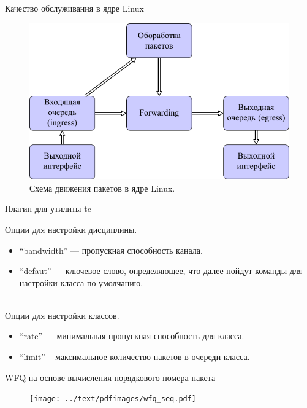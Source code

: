 \documentclass[12pt]{beamer}
\begin{document}
\begin{frame}{Качество обслуживания в ядре Linux}
	\begin{figure}
		\center
    	\includegraphics[scale=0.8]{../text/pdfimages/qdisc.pdf}
		\caption*{Схема движения пакетов в ядре Linux.}
	\end{figure}
\end{frame}

\begin{frame}[fragile]{Плагин для утилиты tc}

	Опции для настройки дисциплины.
	\begin{itemize}
		\item ``bandwidth'' --- пропускная способность канала.
		\item ``defaut''	--- ключевое слово, определяющее, что далее пойдут команды для настройки класса по умолчанию.

	\end{itemize}
~\\
	Опции для настройки классов.
	\begin{itemize}
		\item ``rate'' --- минимальная пропускная способность для класса.
		\item ``limit'' -- максимальное количество пакетов в очереди класса.
	\end{itemize}

\end{frame}

\begin{frame}{WFQ на основе вычисления порядкового номера пакета}
	\begin{figure}
		\center
    	\texttt{[image: ../text/pdfimages/wfq\_seq.pdf]}
		\caption*{}
	\end{figure}
\end{frame}
\end{document}
